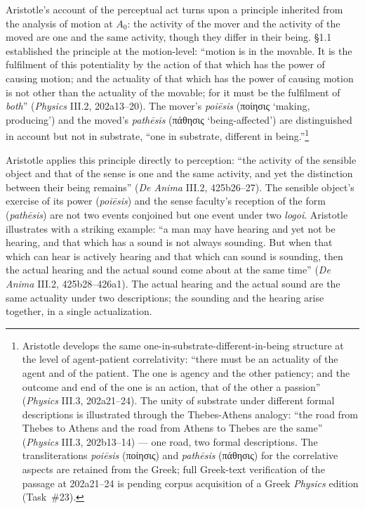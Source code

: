 \documentclass{article}
\newcommand{\gk}[1]{{\greekfont #1}}
\begin{document}
Aristotle's account of the perceptual act turns upon a principle inherited from the analysis of motion at $A_0$: the activity of the mover and the activity of the moved are one and the same activity, though they differ in their being. §1.1 established the principle at the motion-level: ``motion is in the movable. It is the fulfilment of this potentiality by the action of that which has the power of causing motion; and the actuality of that which has the power of causing motion is not other than the actuality of the movable; for it must be the fulfilment of \textit{both}'' (\textit{Physics} III.2, 202a13--20). The mover's \textit{poiēsis} (\gk{ποίησις} `making, producing') and the moved's \textit{pathēsis} (\gk{πάθησις} `being-affected') are distinguished in account but not in substrate, ``one in substrate, different in being.''\footnote{Aristotle develops the same one-in-substrate-different-in-being structure at the level of agent-patient correlativity: ``there must be an actuality of the agent and of the patient. The one is agency and the other patiency; and the outcome and end of the one is an action, that of the other a passion'' (\textit{Physics} III.3, 202a21--24). The unity of substrate under different formal descriptions is illustrated through the Thebes-Athens analogy: ``the road from Thebes to Athens and the road from Athens to Thebes are the same'' (\textit{Physics} III.3, 202b13--14) --- one road, two formal descriptions. The transliterations \textit{poiēsis} (\gk{ποίησις}) and \textit{pathēsis} (\gk{πάθησις}) for the correlative aspects are retained from the Greek; full Greek-text verification of the passage at 202a21--24 is pending corpus acquisition of a Greek \textit{Physics} edition (Task~\#23).}

Aristotle applies this principle directly to perception: ``the activity of the sensible object and that of the sense is one and the same activity, and yet the distinction between their being remains'' (\textit{De Anima} III.2, 425b26--27). The sensible object's exercise of its power (\textit{poiēsis}) and the sense faculty's reception of the form (\textit{pathēsis}) are not two events conjoined but one event under two \textit{logoi}. Aristotle illustrates with a striking example: ``a man may have hearing and yet not be hearing, and that which has a sound is not always sounding. But when that which can hear is actively hearing and that which can sound is sounding, then the actual hearing and the actual sound come about at the same time'' (\textit{De Anima} III.2, 425b28--426a1). The actual hearing and the actual sound are the same actuality under two descriptions; the sounding and the hearing arise together, in a single actualization.
\end{document}
